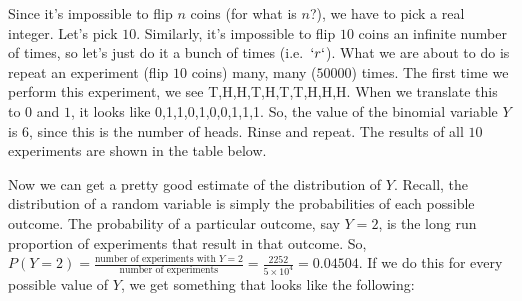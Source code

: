 \documentclass[]{book}
\theoremstyle{definition}
\theoremstyle{definition}
\theoremstyle{definition}
\theoremstyle{remark}
\begin{document}
Since it's impossible to flip \(n\) coins (for what is \(n\)?), we have to pick a real integer. Let's pick \(10\). Similarly, it's impossible to flip \(10\) coins an infinite number of times, so let's just do it a bunch of times (i.e.~\(`r `\)). What we are about to do is repeat an experiment (flip \(10\) coins) many, many (\(50000\)) times. The first time we perform this experiment, we see T,H,H,T,H,T,T,H,H,H. When we translate this to \(0\) and \(1\), it looks like 0,1,1,0,1,0,0,1,1,1. So, the value of the binomial variable \(Y\) is 6, since this is the number of heads. Rinse and repeat. The results of all \(10\) experiments are shown in the table below.

\hypertarget{htmlwidget-114adde79a5d99c64891}{}

Now we can get a pretty good estimate of the distribution of \(Y\). Recall, the distribution of a random variable is simply the probabilities of each possible outcome. The probability of a particular outcome, say \(Y = 2\), is the long run proportion of experiments that result in that outcome. So, \(P(Y = 2) = \frac{\text{number of experiments with } Y = 2}{\text{number of experiments}} = \frac{2252}{\ensuremath{5\times 10^{4}}} = 0.04504\). If we do this for every possible value of \(Y\), we get something that looks like the following:
\end{document}
